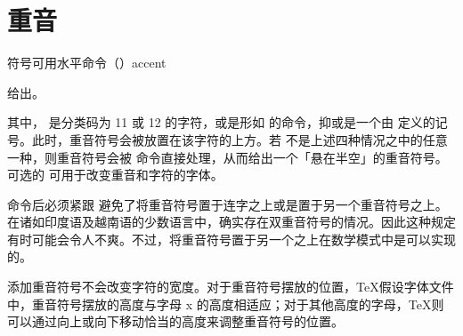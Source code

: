 \documentclass{book}
\begin{document}
\section{重音}

符号可用水平命令（）\csterm accent\par 给出。\label{character}
\begin{disp}
\end{disp}
其中， 是分类码为 11 或 12 的字符，或是形如  的命令，抑或是一个由  定义的记号。此时，重音符号会被放置在该字符的上方。若  不是上述四种情况之中的任意一种，则重音符号会被  命令直接处理，从而给出一个「悬在半空」的重音符号。可选的  可用于改变重音和字符的字体。

 命令后必须紧跟  避免了将重音符号置于连字之上或是置于另一个重音符号之上。在诸如印度语及越南语的少数语言中，确实存在双重音符号的情况。因此这种规定有时可能会令人不爽。不过，将重音符号置于另一个之上在数学模式中是可以实现的。

添加重音符号不会改变字符的宽度。对于重音符号摆放的位置，\TeX 假设字体文件中，重音符号摆放的高度与字母 x 的高度相适应；对于其他高度的字母，\TeX 则可以通过向上或向下移动恰当的高度来调整重音符号的位置。
\end{document}
